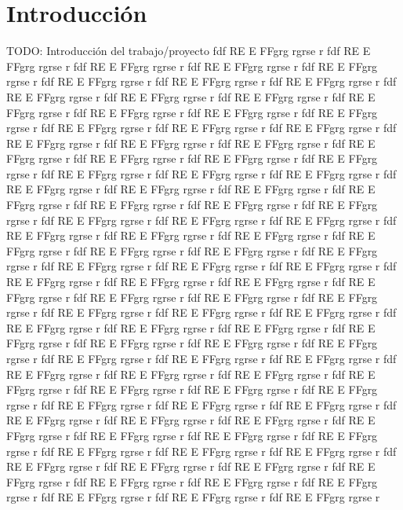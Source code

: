 \chapter{Introducción}

TODO: Introducción del trabajo/proyecto
fdf RE E FFgrg rgrse  r
fdf RE E FFgrg rgrse  r
fdf RE E FFgrg rgrse  r
fdf RE E FFgrg rgrse  r
fdf RE E FFgrg rgrse  r
fdf RE E FFgrg rgrse  r
fdf RE E FFgrg rgrse  r
fdf RE E FFgrg rgrse  r
fdf RE E FFgrg rgrse  r
fdf RE E FFgrg rgrse  r
fdf RE E FFgrg rgrse  r
fdf RE E FFgrg rgrse  r
fdf RE E FFgrg rgrse  r
fdf RE E FFgrg rgrse  r
fdf RE E FFgrg rgrse  r
fdf RE E FFgrg rgrse  r
fdf RE E FFgrg rgrse  r
fdf RE E FFgrg rgrse  r
fdf RE E FFgrg rgrse  r
fdf RE E FFgrg rgrse  r
fdf RE E FFgrg rgrse  r
fdf RE E FFgrg rgrse  r
fdf RE E FFgrg rgrse  r
fdf RE E FFgrg rgrse  r
fdf RE E FFgrg rgrse  r
fdf RE E FFgrg rgrse  r
fdf RE E FFgrg rgrse  r
fdf RE E FFgrg rgrse  r
fdf RE E FFgrg rgrse  r
fdf RE E FFgrg rgrse  r
fdf RE E FFgrg rgrse  r
fdf RE E FFgrg rgrse  r
fdf RE E FFgrg rgrse  r
fdf RE E FFgrg rgrse  r
fdf RE E FFgrg rgrse  r
fdf RE E FFgrg rgrse  r
fdf RE E FFgrg rgrse  r
fdf RE E FFgrg rgrse  r
fdf RE E FFgrg rgrse  r
fdf RE E FFgrg rgrse  r
fdf RE E FFgrg rgrse  r
fdf RE E FFgrg rgrse  r
fdf RE E FFgrg rgrse  r
fdf RE E FFgrg rgrse  r
fdf RE E FFgrg rgrse  r
fdf RE E FFgrg rgrse  r
fdf RE E FFgrg rgrse  r
fdf RE E FFgrg rgrse  r
fdf RE E FFgrg rgrse  r
fdf RE E FFgrg rgrse  r
fdf RE E FFgrg rgrse  r
fdf RE E FFgrg rgrse  r
fdf RE E FFgrg rgrse  r
fdf RE E FFgrg rgrse  r
fdf RE E FFgrg rgrse  r
fdf RE E FFgrg rgrse  r
fdf RE E FFgrg rgrse  r
fdf RE E FFgrg rgrse  r
fdf RE E FFgrg rgrse  r
fdf RE E FFgrg rgrse  r
fdf RE E FFgrg rgrse  r
fdf RE E FFgrg rgrse  r
fdf RE E FFgrg rgrse  r
fdf RE E FFgrg rgrse  r
fdf RE E FFgrg rgrse  r
fdf RE E FFgrg rgrse  r
fdf RE E FFgrg rgrse  r
fdf RE E FFgrg rgrse  r
fdf RE E FFgrg rgrse  r
fdf RE E FFgrg rgrse  r
fdf RE E FFgrg rgrse  r
fdf RE E FFgrg rgrse  r
fdf RE E FFgrg rgrse  r
fdf RE E FFgrg rgrse  r
fdf RE E FFgrg rgrse  r
fdf RE E FFgrg rgrse  r
fdf RE E FFgrg rgrse  r
fdf RE E FFgrg rgrse  r
fdf RE E FFgrg rgrse  r
fdf RE E FFgrg rgrse  r
fdf RE E FFgrg rgrse  r
fdf RE E FFgrg rgrse  r
fdf RE E FFgrg rgrse  r
fdf RE E FFgrg rgrse  r
fdf RE E FFgrg rgrse  r
fdf RE E FFgrg rgrse  r
fdf RE E FFgrg rgrse  r
fdf RE E FFgrg rgrse  r
fdf RE E FFgrg rgrse  r
fdf RE E FFgrg rgrse  r
fdf RE E FFgrg rgrse  r
fdf RE E FFgrg rgrse  r
fdf RE E FFgrg rgrse  r
fdf RE E FFgrg rgrse  r
fdf RE E FFgrg rgrse  r
fdf RE E FFgrg rgrse  r
fdf RE E FFgrg rgrse  r
fdf RE E FFgrg rgrse  r
